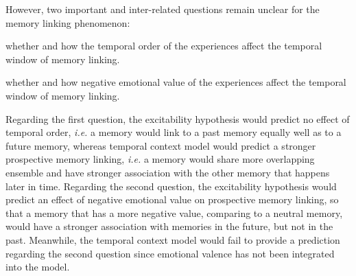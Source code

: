 \documentclass[master.tex]{subfiles}
\begin{document}
However, two important and inter-related questions remain unclear for the
memory linking phenomenon:
\begin{inparaenum}[a)] \bfseries
\item whether and how the temporal order of the experiences affect the temporal
  window of memory linking.
\item whether and how negative emotional value of the experiences affect the
  temporal window of memory linking.
\end{inparaenum}
Regarding the first question, the excitability hypothesis would predict no
effect of temporal order, \textit{i.e.} a memory would link to a past memory
equally well as to a future memory, whereas temporal context model would predict
a stronger prospective memory linking, \textit{i.e.} a memory would share more
overlapping ensemble and have stronger association with the other memory that
happens later in time. Regarding the second question, the excitability
hypothesis would predict an effect of negative emotional value on prospective
memory linking, so that a memory that has a more negative value, comparing to a
neutral memory, would have a stronger association with memories in the future,
but not in the past. Meanwhile, the temporal context model would fail to provide
a prediction regarding the second question since emotional valence has not been
integrated into the model.
\end{document}
